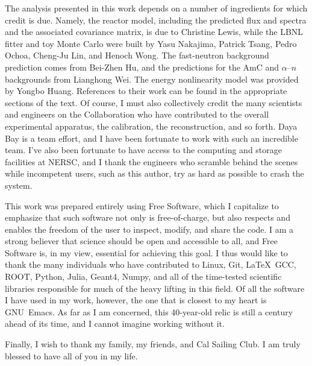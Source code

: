 \documentclass[../thesis.tex]{subfiles}
\begin{document}
The analysis presented in this work depends on a number of ingredients for which credit is due. Namely, the reactor model, including the predicted flux and spectra and the associated covariance matrix, is due to Christine Lewis, while the LBNL fitter and toy Monte Carlo were built by Yasu Nakajima, Patrick Tsang, Pedro Ochoa, Cheng-Ju Lin, and Henoch Wong. The fast-neutron background prediction comes from Bei-Zhen Hu, and the predictions for the AmC and $\alpha$--$n$ backgrounds from Lianghong Wei. The energy nonlinearity model was provided by Yongbo Huang. References to their work can be found in the appropriate sections of the text. Of course, I must also collectively credit the many scientists and engineers on the Collaboration who have contributed to the overall experimental apparatus, the calibration, the reconstruction, and so forth. Daya Bay is a team effort, and I have been fortunate to work with such an incredible team. I've also been fortunate to have access to the computing and storage facilities at NERSC, and I thank the engineers who scramble behind the scenes while incompetent users, such as this author, try as hard as possible to crash the system.

This work was prepared entirely using Free Software, which I capitalize to emphasize that such software not only is free-of-charge, but also respects and enables the freedom of the user to inspect, modify, and share the code. I am a strong believer that science should be open and accessible to all, and Free Software is, in my view, essential for achieving this goal. I thus would like to thank the many individuals who have contributed to Linux, Git, \LaTeX\, GCC, ROOT, Python, Julia, Geant4, Numpy, and all of the time-tested scientific libraries responsible for much of the heavy lifting in this field. Of all the software I have used in my work, however, the one that is closest to my heart is GNU~Emacs. As far as I am concerned, this 40-year-old relic is still a century ahead of its time, and I cannot imagine working without it.

Finally, I wish to thank my family, my friends, and Cal Sailing Club. I am truly blessed to have all of you in my life.
\end{document}
